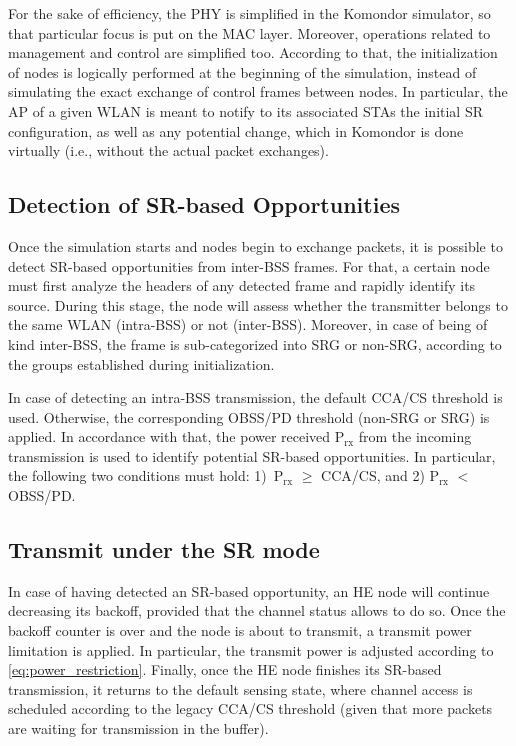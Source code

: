 \documentclass[conference]{IEEEtran}
\begin{document}
	For the sake of efficiency, the PHY is simplified in the Komondor simulator, so that particular focus is put on the MAC layer. Moreover, operations related to management and control are simplified too. According to that, the initialization of nodes is logically performed at the beginning of the simulation, instead of simulating the exact exchange of control frames between nodes. In particular, the AP of a given WLAN is meant to notify to its associated STAs the initial SR configuration, as well as any potential change, which in Komondor is done virtually (i.e., without the actual packet exchanges).

	\subsection{Detection of SR-based Opportunities}
	
	Once the simulation starts and nodes begin to exchange packets, it is possible to detect SR-based opportunities from inter-BSS frames. For that, a certain node must first analyze the headers of any detected frame and rapidly identify its source. During this stage, the node will assess whether the transmitter belongs to the same WLAN (intra-BSS) or not (inter-BSS). Moreover, in case of being of kind inter-BSS, the frame is sub-categorized into SRG or non-SRG, according to the groups established during initialization.
	
	In case of detecting an intra-BSS transmission, the default CCA/CS threshold is used. Otherwise, the corresponding OBSS/PD threshold (non-SRG or SRG) is applied. In accordance with that, the power received P$_\text{rx}$ from the incoming transmission is used to identify potential SR-based opportunities. In particular, the following two conditions must hold: 1)~P$_\text{rx}$ $\geq$ CCA/CS, and 2) P$_\text{rx}$ $<$ OBSS/PD.
	
	\subsection{Transmit under the SR mode}
	In case of having detected an SR-based opportunity, an HE node will continue decreasing its backoff, provided that the channel status allows to do so. Once the backoff counter is over and the node is about to transmit, a transmit power limitation is applied. In particular, the transmit power is adjusted according to \eqref{eq:power_restriction}. Finally, once the HE node finishes its SR-based transmission, it returns to the default sensing state, where channel access is scheduled according to the legacy CCA/CS threshold (given that more packets are waiting for transmission in the buffer).
	
\end{document}
